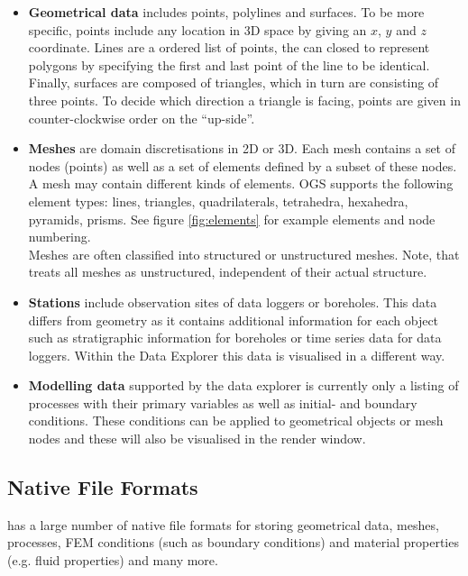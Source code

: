 \begin{itemize}
\item \textbf{Geometrical data} includes points, polylines and surfaces. To be more specific, points include any location in 3D space by giving an $x$, $y$ and $z$ coordinate. Lines are a ordered list of points, the can closed to represent polygons by specifying the first and last point of the line to be identical. Finally, surfaces are composed of triangles, which in turn are consisting of three points. To decide which direction a triangle is facing, points are given in counter-clockwise order on the ``up-side''.
\item \textbf{Meshes} are domain discretisations in 2D or 3D. Each mesh contains a set of nodes (points) as well as a set of elements defined by a subset of these nodes. A mesh may contain different kinds of elements. OGS supports the following element types: lines, triangles, quadrilaterals, tetrahedra, hexahedra, pyramids, prisms. See figure \ref{fig:elements} for example elements and node numbering.\\
    Meshes are often classified into structured or unstructured meshes. Note, that \ogs treats all meshes as unstructured, independent of their actual structure.
\item \textbf{Stations} include observation sites of data loggers or boreholes. This data differs from geometry as it contains additional information for each object such as stratigraphic information for boreholes or time series data for data loggers. Within the Data Explorer this data is visualised in a different way.
\item \textbf{Modelling data} supported by the data explorer is currently only a listing of processes with their primary variables as well as initial- and boundary conditions. These conditions can be applied to geometrical objects or mesh nodes and these will also be visualised in the render window.
\end{itemize}


\subsection{Native File Formats}
\label{nativefileformats}

\ogs has a large number of native file formats for storing geometrical data, meshes, processes, FEM conditions (such as boundary conditions) and material properties (e.g. fluid properties) and many more.

